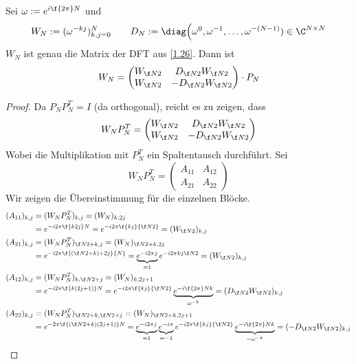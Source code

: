 \documentclass[11pt]{scrbook}
\begin{document}
\begin{lem}
	\label{1.28}
	Sei $\omega := e^{i\f {2\pi}N}$ und
	\[
		W_N := (\omega^{-kj})_{k,j=0}^N \qquad
		D_N := \diag\Big(\omega^0, \omega^{-1}, \dotsc, \omega^{-(N-1)}) \in \C^{N\times N}
	\]
	$W_N$ ist genau die Matrix der DFT aus \ref{1.26}.
	Dann ist
	\[
		W_N = \begin{pmatrix}W_{\f N2} & D_{\f N2}W_{\f N2} \\
			W_{\f N2} & - D_{\f N2} W_{\f N2} \end{pmatrix}
		\cdot P_N
	\]
	\begin{proof}
		Da $P_NP_N^T = I$ (da orthogonal), reicht es zu zeigen, dass
		\[
			W_NP_N^T = \begin{pmatrix}W_{\f N2} & D_{\f N2}W_{\f N2} \\
			W_{\f N2} & - D_{\f N2} W_{\f N2} \end{pmatrix}
		\]
		Wobei die Multiplikation mit $P_N^T$ ein Spaltentausch durchführt.
		Sei 
		\[
			W_NP_N^T = \begin{pmatrix}
				A_{11} & A_{12}\\
				A_{21} & A_{22}
			\end{pmatrix}
		\]
		Wir zeigen die Übereinstimmung für die einzelnen Blöcke.
		\begin{align*}
			(A_{11})_{k,j}
			&= (W_N P_N^T)_{k,j} = (W_N)_{k,2j} \\
			&= e^{-i2\pi \f {k2j}N} = e^{-i2\pi \f {kj}{\f N2}} = (W_{\f N2})_{k,j} \\
			(A_{21})_{k,j}
			&= (W_N P_N^T)_{\f N2 + k,j} = (W_N)_{\f N2+k,2j} \\
			&= e^{-i2\pi \f {(\f N2 + k)+2j}{N}} = \underbrace{e^{-i2\pi j}}_{=1} e^{-i2\pi {kj}{\f N2}} = (W_{\f N2})_{k,j} \\
			(A_{12})_{k,j} 
			&= (W_NP_N^T)_{k,\f N2 +j} = (W_N)_{k,2j+1} \\
			&= e^{-i2\pi \f {k(2j+1)}N} = e^{-i2\pi \f {kj}{\f N2}} \underbrace{e^{-i \f {2\pi}N k}}_{\omega^{-k}} = (D_{\f N2}W_{\f N2})_{k,j} \\
			(A_{22})_{k,j} 
			&= (W_NP_N^T)_{\f N2+k,\f N2+j} = (W_N)_{\f N2+k, 2j+1} \\
			&= e^{-2\pi\f {(\f N2 +k)(2j+1)}N} = \underbrace{e^{-i2\pi j}}_{=1} \underbrace{e^{-i\pi}}_{=-1} e^{-i2\pi \f {kj}{\f N2}} \underbrace{e^{-i\f {2\pi}N k}}_{=\omega^{-k}} = (-D_{\f N2}W_{\f N2})_{k,j}
		\end{align*}
	\end{proof}
\end{lem}
\end{document}
